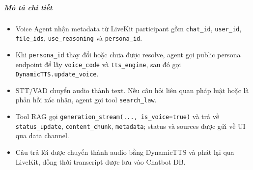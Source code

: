 \subparagraph{Mô tả chi tiết}
\begin{itemize}
\item Voice Agent nhận metadata từ LiveKit participant gồm \texttt{chat\_id}, \texttt{user\_id}, \texttt{file\_ids}, \texttt{use\_reasoning} và \texttt{persona\_id}.
\item Khi \texttt{persona\_id} thay đổi hoặc chưa được resolve, agent gọi public persona endpoint để lấy \texttt{voice\_code} và \texttt{tts\_engine}, sau đó gọi \texttt{DynamicTTS.update\_voice}.
\item STT/VAD chuyển audio thành text. Nếu câu hỏi liên quan pháp luật hoặc là phản hồi xác nhận, agent gọi tool \texttt{search\_law}.
\item Tool RAG gọi \texttt{generation\_stream(..., is\_voice=true)} và trả về \texttt{status\_update}, \texttt{content\_chunk}, \texttt{metadata}; status và sources được gửi về UI qua data channel.
\item Câu trả lời được chuyển thành audio bằng DynamicTTS và phát lại qua LiveKit, đồng thời transcript được lưu vào Chatbot DB.
\end{itemize}
